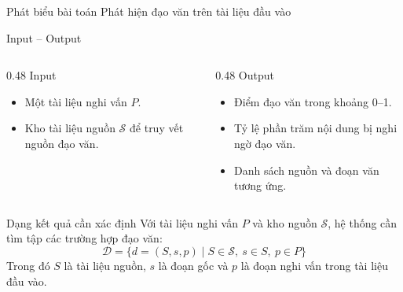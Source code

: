 \documentclass[aspectratio=169,11pt]{beamer}
\def\textbf#1{#1}%
\begin{document}
\begin{frame}{Phát biểu bài toán}
\textbf{\Large \textcolor{primaryblue}{Phát hiện đạo văn trên tài liệu đầu vào}}
\vspace{0.15cm}

\begin{block}{Input -- Output}
\begin{columns}[T]
\begin{column}{0.48\textwidth}
\textbf{Input}
\begin{itemize}
  \item Một tài liệu nghi vấn $P$.
  \item Kho tài liệu nguồn $\mathcal{S}$ để truy vết nguồn đạo văn.
\end{itemize}
\end{column}
\begin{column}{0.48\textwidth}
\textbf{Output}
\begin{itemize}
  \item Điểm đạo văn trong khoảng \textbf{0--1}.
  \item Tỷ lệ phần trăm nội dung bị nghi ngờ đạo văn.
  \item Danh sách nguồn và đoạn văn tương ứng.
\end{itemize}
\end{column}
\end{columns}
\end{block}

\vspace{0.15cm}
\begin{block}{Dạng kết quả cần xác định}
\small
Với tài liệu nghi vấn $P$ và kho nguồn $\mathcal{S}$, hệ thống cần tìm tập các trường hợp đạo văn:
\[
  \mathcal{D}=\{d=(S, s, p)\mid S\in\mathcal{S},\ s\in S,\ p\in P\}
\]
Trong đó $S$ là tài liệu nguồn, $s$ là đoạn gốc và $p$ là đoạn nghi vấn trong tài liệu đầu vào.
\end{block}
\end{frame}
\end{document}
